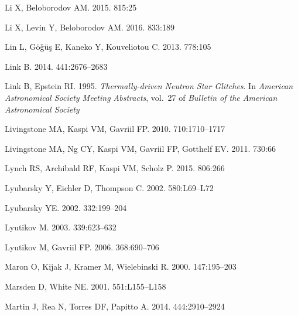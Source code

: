 \documentclass[letterpaper]{ar-1col}
\begin{document}
\begin{thebibliography}{}
{Li} X, {Beloborodov} AM. 2015.
\textit{\apj} 815:25

{Li} X, {Levin} Y, {Beloborodov} AM. 2016.
\textit{\apj} 833:189

{Lin} L, {G{\"o}{\v g}{\"u}{\c s}} E, {Kaneko} Y, {Kouveliotou} C. 2013.
\textit{\apj} 778:105

{Link} B. 2014.
\textit{\mnras} 441:2676--2683

{Link} B, {Epstein} RI. 1995.
\textit{{Thermally-driven Neutron Star Glitches}}. In \textit{American
  Astronomical Society Meeting Abstracts}, vol.~27 of \textit{Bulletin of the
  American Astronomical Society}

{Livingstone} MA, {Kaspi} VM, {Gavriil} FP. 2010.
\textit{\apj} 710:1710--1717

{Livingstone} MA, {Ng} CY, {Kaspi} VM, {Gavriil} FP, {Gotthelf} EV. 2011.
\textit{\apj} 730:66

{Lynch} RS, {Archibald} RF, {Kaspi} VM, {Scholz} P. 2015.
\textit{\apj} 806:266

{Lyubarsky} Y, {Eichler} D, {Thompson} C. 2002.
\textit{\apj} 580:L69--L72

{Lyubarsky} YE. 2002.
\textit{\mnras} 332:199--204

Lyutikov M. 2003.
\textit{\mnras} 339:623--632

{Lyutikov} M, {Gavriil} FP. 2006.
\textit{\mnras} 368:690--706

{Maron} O, {Kijak} J, {Kramer} M, {Wielebinski} R. 2000.
\textit{\aaps} 147:195--203

{Marsden} D, {White} NE. 2001.
\textit{\apj} 551:L155--L158

{Martin} J, {Rea} N, {Torres} DF, {Papitto} A. 2014.
\textit{\mnras} 444:2910--2924


\end{thebibliography}
\end{document}
